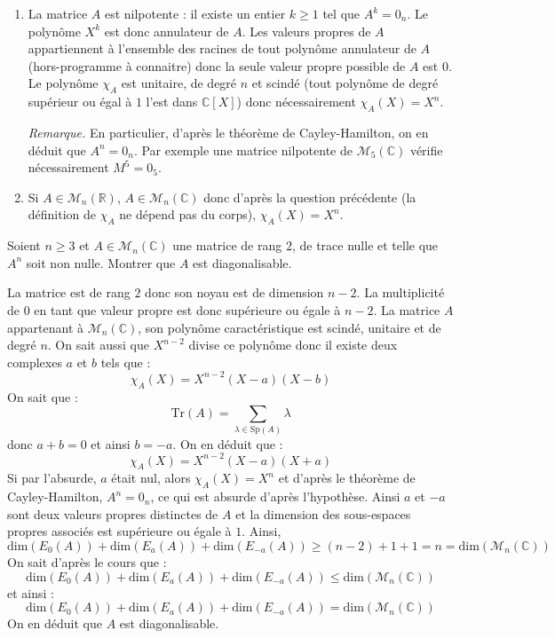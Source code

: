\documentclass[a4paper,10pt]{report}
\begin{document}
\corr 

\begin{enumerate}
\item La matrice $A$ est nilpotente : il existe un entier $k \geq 1$ tel que $A^k = 0_n$. Le polynôme $X^k$ est donc annulateur de $A$. Les valeurs propres de $A$ appartiennent à l'ensemble des racines de tout polynôme annulateur de $A$ (hors-programme à connaitre) donc la seule valeur propre possible de $A$ est $0$. Le polynôme $\chi_A$ est unitaire, de degré $n$ et scindé (tout polynôme de degré supérieur ou égal à $1$ l'est dans $\mathbb{C}[X]$) donc nécessairement $\chi_A(X)=X^n$.

\medskip

\noindent \textit{Remarque.} En particulier, d'après le théorème de Cayley-Hamilton, on en déduit que $A^n=0_n$. Par exemple une matrice nilpotente de $\mathcal{M}_5(\mathbb{C})$ vérifie nécessairement $M^5=0_5$.
\item Si $A \in \mathcal{M}_n(\mathbb{R})$, $A \in \mathcal{M}_n(\mathbb{C})$ donc d'après la question précédente (la définition de $\chi_A$ ne dépend pas du corps), $\chi_A(X)=X^n$.
\end{enumerate}

\begin{Exa} Soient $n \geq 3$ et $A \in \mathcal{M}_{n}(\mathbb{C})$ une matrice de rang $2$, de trace nulle et telle que $A^n$ soit non nulle. Montrer que $A$ est diagonalisable.
\end{Exa}

\corr La matrice est de rang $2$ donc son noyau est de dimension $n-2$. La multiplicité de $0$ en tant que valeur propre est donc supérieure ou égale à $n-2$. La matrice $A$ appartenant à $\mathcal{M}_{n}(\mathbb{C})$, son polynôme caractéristique est scindé, unitaire et de degré $n$. On sait aussi que $X^{n-2}$ divise ce polynôme donc il existe deux complexes $a$ et $b$ tels que :
$$ \chi_A(X)= X^{n-2} (X-a)(X-b)$$
On sait que :
$$ \textrm{Tr}(A) = \sum_{\lambda \in \textrm{Sp}(A)} \lambda$$
donc $a+b=0$ et ainsi $b=-a$. On en déduit que :
$$ \chi_A(X)= X^{n-2} (X-a)(X+a)$$
Si par l'absurde, $a$ était nul, alors $\chi_A(X)=X^n$ et d'après le théorème de Cayley-Hamilton, $A^n= 0_n$, ce qui est absurde d'après l'hypothèse. Ainsi $a$ et $-a$ sont deux valeurs propres distinctes de $A$ et la dimension des sous-espaces propres associés est supérieure ou égale à $1$. Ainsi,
$$ \textrm{dim}(E_0(A)) + \textrm{dim}(E_a(A)) + \textrm{dim}(E_{-a}(A)) \geq (n-2)+1+1 = n = \textrm{dim}(\mathcal{M}_n(\mathbb{C}))$$
On sait d'après le cours que :
$$   \textrm{dim}(E_0(A)) + \textrm{dim}(E_a(A)) + \textrm{dim}(E_{-a}(A)) \leq \textrm{dim}(\mathcal{M}_n(\mathbb{C}))$$
et ainsi :
$$   \textrm{dim}(E_0(A)) + \textrm{dim}(E_a(A)) + \textrm{dim}(E_{-a}(A)) = \textrm{dim}(\mathcal{M}_n(\mathbb{C}))$$
On en déduit que $A$ est diagonalisable.
\end{document}

